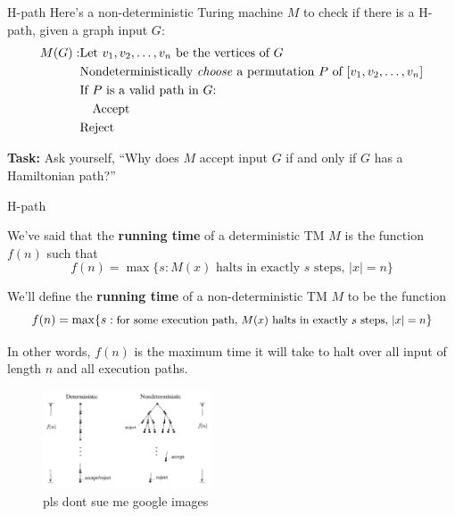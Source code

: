 \documentclass{beamer}
\begin{document}
\begin{frame}{H-path}
Here's a non-deterministic Turing machine $M$ to check if there is a H-path, given a graph input $G$:
\begin{align*}
M(G):& \text{Let $v_1, v_2, \ldots, v_n$ be the vertices of $G$}\\
&\text{Nondeterministically \textit{choose} a permutation $P$ of $[v_1, v_2, \ldots, v_n]$}\\
&\text{If $P$ is a valid path in $G$:}\\
&\quad \text{Accept}\\
&\text{Reject}
\end{align*}

\textbf{Task:} Ask yourself, ``Why does $M$ accept input $G$ if and only if $G$ has a Hamiltonian path?'' 

\end{frame}

\begin{frame}{H-path}

We've said that the \textbf{running time} of a deterministic TM $M$ is the function $f(n)$ such that 
$$f(n) = \max\{s: \text{$M(x)$ halts in exactly $s$ steps, $|x| = n$}\}$$

We'll define the \textbf{running time} of a non-deterministic TM $M$ to be the function
$$f(n) = \max\{s: \text{\small for some execution path, $M(x)$ halts in exactly $s$ steps, $|x| = n$}\}$$

In other words, $f(n)$ is the maximum time it will take to halt over all input of length $n$ and all execution paths.

\begin{figure}[h]
\centering
\includegraphics[width=5cm]{img/copied_diagram}
\caption*{pls dont sue me google images}
\end{figure}

\end{frame}
\end{document}
